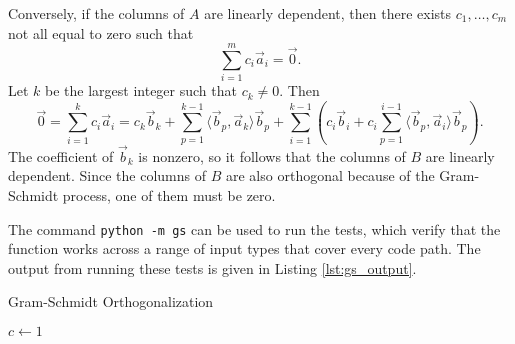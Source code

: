 \documentclass{homework}
\begin{document}
	Conversely, if the columns of $A$ are linearly dependent, then there exists $c_1,\dots, c_m$ not all equal to zero such that
	\begin{equation*}
		\sum_{i=1}^m c_i\vec{a}_i = \vec{0}.
	\end{equation*}
	Let $k$ be the largest integer such that $c_k \ne 0$. Then
	\begin{equation*}
		\vec{0} = \sum_{i=1}^kc_i\vec{a}_i = c_k\vec{b}_k  + \sum_{p=1}^{k-1}\langle\vec{b}_p,\vec{a}_k\rangle\vec{b}_p + \sum_{i=1}^{k-1}\left(c_i\vec{b}_i + c_i\sum_{p=1}^{i-1}\langle\vec{b}_p,\vec{a}_i\rangle\vec{b}_p\right).
	\end{equation*}
	The coefficient of $\vec{b}_k$ is nonzero, so it follows that the columns of $B$ are linearly dependent. Since the columns of $B$ are also orthogonal because of the Gram-Schmidt process, one of them must be zero.
	
	The command \texttt{python -m gs} can be used to run the tests, which verify that the function works across a range of input types that cover every code path. The output from running these tests is given in Listing \ref{lst:gs_output}.
	\begin{algorithm}
		\caption{Gram-Schmidt Orthogonalization}\label{alg:gs}
		$c \gets 1$\;
	\end{algorithm}
	
	
	
\end{document}
